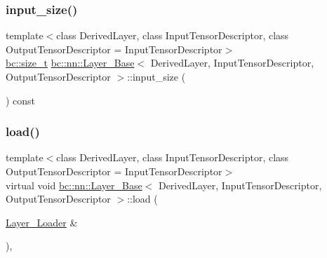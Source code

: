 \mbox{\label{structbc_1_1nn_1_1Layer__Base_a215129f56ab675fb8249b82f8f859ac4}} 
\subsubsection{\texorpdfstring{input\+\_\+size()}{input\_size()}}
{\footnotesize\ttfamily template$<$class Derived\+Layer, class Input\+Tensor\+Descriptor, class Output\+Tensor\+Descriptor = Input\+Tensor\+Descriptor$>$ \\
\hyperlink{namespacebc_aaf8e3fbf99b04b1b57c4f80c6f55d3c5}{bc\+::size\+\_\+t} \hyperlink{structbc_1_1nn_1_1Layer__Base}{bc\+::nn\+::\+Layer\+\_\+\+Base}$<$ Derived\+Layer, Input\+Tensor\+Descriptor, Output\+Tensor\+Descriptor $>$\+::input\+\_\+size (\begin{DoxyParamCaption}{ }\end{DoxyParamCaption}) const\hspace{0.3cm}{\ttfamily [inline]}}

\mbox{\label{structbc_1_1nn_1_1Layer__Base_a5b3a9854215815f810bef4922b74efaf}} 
\subsubsection{\texorpdfstring{load()}{load()}}
{\footnotesize\ttfamily template$<$class Derived\+Layer, class Input\+Tensor\+Descriptor, class Output\+Tensor\+Descriptor = Input\+Tensor\+Descriptor$>$ \\
virtual void \hyperlink{structbc_1_1nn_1_1Layer__Base}{bc\+::nn\+::\+Layer\+\_\+\+Base}$<$ Derived\+Layer, Input\+Tensor\+Descriptor, Output\+Tensor\+Descriptor $>$\+::load (\begin{DoxyParamCaption}\item[{\hyperlink{structbc_1_1nn_1_1Layer__Loader}{Layer\+\_\+\+Loader} \&}]{ }\end{DoxyParamCaption})\hspace{0.3cm}{\ttfamily [inline]}, {\ttfamily [virtual]}}



